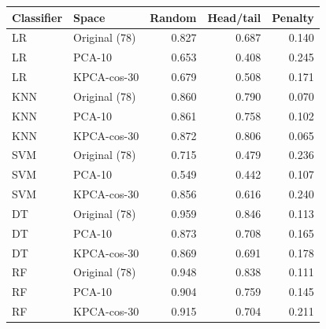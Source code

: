 \begin{tabular}{llrrr}
\toprule
Classifier & Space & Random & Head/tail & Penalty \\
\midrule
LR & Original (78) & 0.827 & 0.687 & 0.140 \\
LR & PCA-10 & 0.653 & 0.408 & 0.245 \\
LR & KPCA-cos-30 & 0.679 & 0.508 & 0.171 \\
KNN & Original (78) & 0.860 & 0.790 & 0.070 \\
KNN & PCA-10 & 0.861 & 0.758 & 0.102 \\
KNN & KPCA-cos-30 & 0.872 & 0.806 & 0.065 \\
SVM & Original (78) & 0.715 & 0.479 & 0.236 \\
SVM & PCA-10 & 0.549 & 0.442 & 0.107 \\
SVM & KPCA-cos-30 & 0.856 & 0.616 & 0.240 \\
DT & Original (78) & 0.959 & 0.846 & 0.113 \\
DT & PCA-10 & 0.873 & 0.708 & 0.165 \\
DT & KPCA-cos-30 & 0.869 & 0.691 & 0.178 \\
RF & Original (78) & 0.948 & 0.838 & 0.111 \\
RF & PCA-10 & 0.904 & 0.759 & 0.145 \\
RF & KPCA-cos-30 & 0.915 & 0.704 & 0.211 \\
\bottomrule
\end{tabular}
